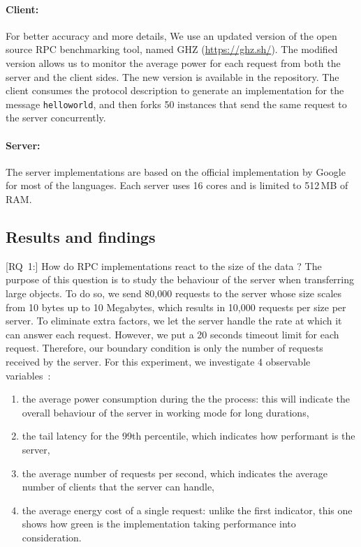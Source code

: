\paragraph{Client:}
For better accuracy and more details, We use an updated version of the open source RPC benchmarking tool, named GHZ (\url{https://ghz.sh/}).
The modified version allows us to monitor the average power for each request from both the server and the client sides.
The new version is available in the repository.%
The client consumes the protocol description to generate an implementation for the message \texttt{helloworld}, and then forks 50 instances that send the same request to the server concurrently.

\paragraph{Server:}
The server implementations are based on the official implementation by Google for most of the languages.
Each server uses 16 cores and is limited to 512\,MB of RAM.

\subsection{Results and findings}
[\textsc{RQ}~1:] How do RPC implementations react to the size of the data ?
The purpose of this question is to study the behaviour of the server when transferring large objects.
To do so, we send 80,000 requests to the server whose size scales from 10 bytes up to 10 Megabytes, which results in 10,000 requests per size per server.
To eliminate extra factors, we let the server handle the rate at which it can answer each request.
However, we put a 20 seconds timeout limit for each request.
Therefore, our boundary condition is only the number of requests received by the server.
For this experiment, we investigate 4 observable variables~:
\begin{enumerate}
    \item the \textsf{average power consumption} during the the process: this will indicate the overall behaviour of the server in working mode for long durations,
    \item the \textsf{tail latency} for the 99th percentile, which indicates how performant is the server,
    \item the \textsf{average number of requests per second}, which indicates the average number of clients that the server can handle,
    \item the \textsf{average energy cost} of a single request: unlike the first indicator, this one shows how green is the implementation taking performance into consideration.
\end{enumerate}

